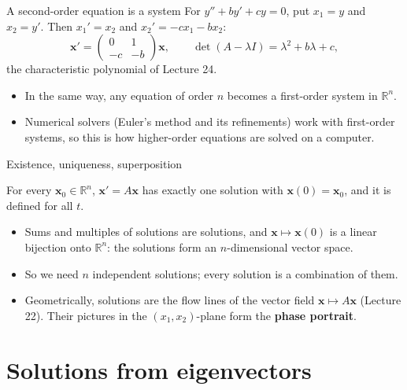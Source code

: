 \documentclass[10pt]{wosm-slides}
\newcommand{\R}{\mathbb{R}}
\newcommand{\vx}{\mathbf{x}}
\begin{document}
\begin{frame}{A second-order equation is a system}
  For $y'' + by' + cy = 0$, put $x_1 = y$ and $x_2 = y'$. Then $x_1' = x_2$ and $x_2' = -c x_1 - b x_2$:
  \[ \vx' = \begin{pmatrix} 0 & 1 \\ -c & -b \end{pmatrix} \vx , \qquad
     \det(A - \lambda I) = \lambda^2 + b\lambda + c , \]
  the characteristic polynomial of Lecture 24.
  \pause
  \begin{itemize}
    \item In the same way, any equation of order $n$ becomes a first-order system in $\R^n$.
    \item Numerical solvers (Euler's method and its refinements) work with first-order systems, so
      this is how higher-order equations are solved on a computer.
  \end{itemize}
\end{frame}

\begin{frame}{Existence, uniqueness, superposition}
  \begin{theorem}
    For every $\vx_0 \in \R^n$, $\vx' = A\vx$ has exactly one solution with $\vx(0) = \vx_0$, and it is
    defined for all $t$.
  \end{theorem}
  \pause
  \begin{itemize}
    \item Sums and multiples of solutions are solutions, and $\vx \mapsto \vx(0)$ is a linear bijection
      onto $\R^n$: the solutions form an $n$-dimensional vector space.
    \item So we need $n$ independent solutions; every solution is a combination of them.
    \item Geometrically, solutions are the flow lines of the vector field $\vx \mapsto A\vx$
      (Lecture 22). Their pictures in the $(x_1, x_2)$-plane form the \textbf{phase portrait}.
  \end{itemize}
\end{frame}

\section{Solutions from eigenvectors}
\end{document}
